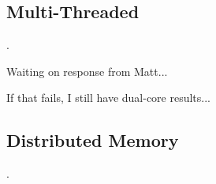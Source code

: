 \documentclass[twoside,leqno,twocolumn]{article}
\newcommand{\authornote}[1]{(\footnote{Note to self: #1})}
\newcommand{\authorsnote}[1]{\authornote{#1}}
\newcommand{\fig}[1]{Figure~\ref{fig:#1}}
\newcommand{\mysub}[1]{\subsection{#1}. }
\begin{document}

\mysub{Multi-Threaded}

Waiting on response from Matt...

If that fails, I still have dual-core results...


\mysub{Distributed Memory}
\end{document}
